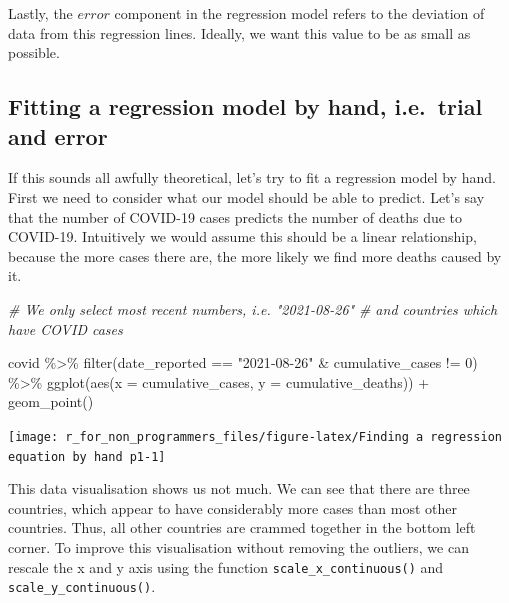 \documentclass[
]{book}
\newenvironment{Shaded}{\begin{snugshade}}{\end{snugshade}}
\newcommand{\AttributeTok}[1]{\textcolor[rgb]{0.77,0.63,0.00}{#1}}
\newcommand{\CommentTok}[1]{\textcolor[rgb]{0.56,0.35,0.01}{\textit{#1}}}
\newcommand{\DecValTok}[1]{\textcolor[rgb]{0.00,0.00,0.81}{#1}}
\newcommand{\FunctionTok}[1]{\textcolor[rgb]{0.00,0.00,0.00}{#1}}
\newcommand{\NormalTok}[1]{#1}
\newcommand{\SpecialCharTok}[1]{\textcolor[rgb]{0.00,0.00,0.00}{#1}}
\newcommand{\StringTok}[1]{\textcolor[rgb]{0.31,0.60,0.02}{#1}}
\begin{document}
Lastly, the \(error\) component in the regression model refers to the deviation of data from this regression lines. Ideally, we want this value to be as small as possible.

\hypertarget{fitting-a-regression-model-by-hand-i.e.-trial-and-error}{%
\subsection{Fitting a regression model by hand, i.e.~trial and error}\label{fitting-a-regression-model-by-hand-i.e.-trial-and-error}}

If this sounds all awfully theoretical, let's try to fit a regression model by hand. First we need to consider what our model should be able to predict. Let's say that the number of COVID-19 cases predicts the number of deaths due to COVID-19. Intuitively we would assume this should be a linear relationship, because the more cases there are, the more likely we find more deaths caused by it.

\begin{Shaded}
\begin{Highlighting}[]
\CommentTok{\# We only select most recent numbers, i.e. "2021{-}08{-}26"}
\CommentTok{\# and countries which have COVID cases}

\NormalTok{covid }\SpecialCharTok{\%\textgreater{}\%}
  \FunctionTok{filter}\NormalTok{(date\_reported }\SpecialCharTok{==} \StringTok{"2021{-}08{-}26"} \SpecialCharTok{\&}
\NormalTok{           cumulative\_cases }\SpecialCharTok{!=} \DecValTok{0}\NormalTok{) }\SpecialCharTok{\%\textgreater{}\%}
  \FunctionTok{ggplot}\NormalTok{(}\FunctionTok{aes}\NormalTok{(}\AttributeTok{x =}\NormalTok{ cumulative\_cases,}
             \AttributeTok{y =}\NormalTok{ cumulative\_deaths)) }\SpecialCharTok{+}
  \FunctionTok{geom\_point}\NormalTok{()}
\end{Highlighting}
\end{Shaded}

\begin{center}\texttt{[image: r\_for\_non\_programmers\_files/figure-latex/Finding a regression equation by hand p1-1]} \end{center}

This data visualisation shows us not much. We can see that there are three countries, which appear to have considerably more cases than most other countries. Thus, all other countries are crammed together in the bottom left corner. To improve this visualisation without removing the outliers, we can rescale the x and y axis using the function \texttt{scale\_x\_continuous()} and \texttt{scale\_y\_continuous()}.
\end{document}
